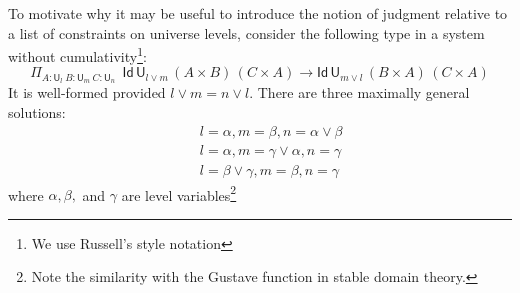 \documentclass[11pt,a4paper]{article}
\theoremstyle{definition}
\newcommand{\Id}{\mathsf{Id}}
\def\UU{\mathsf{U}}
\begin{document}
To motivate why it may be useful to introduce the notion of judgment relative to a list of constraints on universe levels, consider the following type in a system without cumulativity\footnote{We use Russell's style notation}:
%
$$
    \Pi_{A:\UU_l~{B}:{\UU_m}~{C}:{\UU_n}}
    {~~\Id\,\UU_{l \vee m}\, (A\times B)\,(C \times A)
    \to \Id\,\UU_{m \vee l} \, (B\times A)\,(C \times A)}
$$
It is well-formed provided $l \vee m = n \vee l$. There are three maximally general solutions:
\begin{eqnarray*}
&&l = \alpha, m = \beta, n = \alpha \vee \beta\\
&&l = \alpha, m = \gamma \vee \alpha, n = \gamma\\
&&l = \beta \vee \gamma, m = \beta, n = \gamma
\end{eqnarray*}
where $\alpha, \beta,$ and $\gamma$ are level
variables\footnote{Note the similarity with the Gustave function in stable domain theory.}
%
\end{document}
